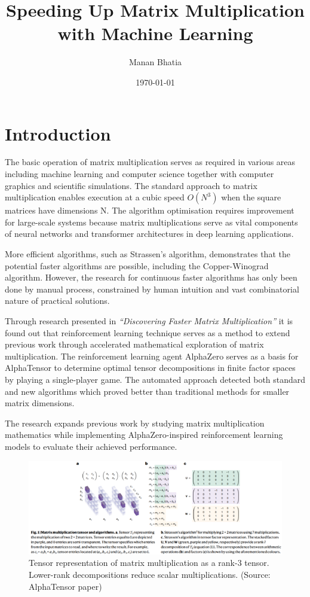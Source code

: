 \documentclass{article}
\title{Speeding Up Matrix Multiplication with Machine Learning}
\author{Manan Bhatia}
\date{\today}
\begin{document}
\maketitle

\section{Introduction}
The basic operation of matrix multiplication serves as required in various areas including machine learning and computer science together with computer graphics and scientific simulations. The standard approach to matrix multiplication enables execution at a cubic speed \( O(N^3) \) when the square matrices have dimensions N. The algorithm optimisation requires improvement for large-scale systems because matrix multiplications serve as vital components of neural networks and transformer architectures in deep learning applications.

More efficient algorithms, such as Strassen's algorithm, demonstrates that the potential faster algorithms are possible, including the Copper-Winograd algorithm. However, the research for continuous faster algorithms has only been done by manual process, constrained by human intuition and vast combinatorial nature of practical solutions.

Through research presented in \textit{“Discovering Faster Matrix Multiplication”} it is found out that reinforcement learning technique serves as a method to extend previous work through accelerated mathematical exploration of matrix multiplication. The reinforcement learning agent AlphaZero serves as a basis for AlphaTensor to determine optimal tensor decompositions in finite factor spaces by playing a single-player game. The automated approach detected both standard and new algorithms which proved better than traditional methods for smaller matrix dimensions.

The research expands previous work by studying matrix multiplication mathematics while implementing AlphaZero-inspired reinforcement learning models to evaluate their achieved performance.
\begin{figure}[ht]
    \centering
    \includegraphics[width=0.6\linewidth]{Picture1.png}
    \caption{Tensor representation of matrix multiplication as a rank-3 tensor. Lower-rank decompositions reduce scalar multiplications. (Source: AlphaTensor paper)}
    \label{fig:tensor-representation}
\end{figure}
\end{document}
